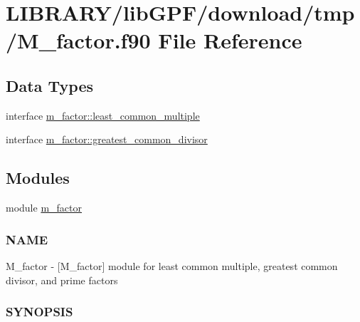 \hypertarget{M__factor_8f90}{}\section{L\+I\+B\+R\+A\+R\+Y/lib\+G\+P\+F/download/tmp/\+M\+\_\+factor.f90 File Reference}
\label{M__factor_8f90}
\subsection*{Data Types}
\begin{DoxyCompactItemize}
\item 
interface \hyperlink{interfacem__factor_1_1least__common__multiple}{m\+\_\+factor\+::least\+\_\+common\+\_\+multiple}
\item 
interface \hyperlink{interfacem__factor_1_1greatest__common__divisor}{m\+\_\+factor\+::greatest\+\_\+common\+\_\+divisor}
\end{DoxyCompactItemize}
\subsection*{Modules}
\begin{DoxyCompactItemize}
\item 
module \hyperlink{namespacem__factor}{m\+\_\+factor}
\begin{DoxyCompactList}\small\item\em \subsubsection*{N\+A\+ME}

M\+\_\+factor -\/ \mbox{[}M\+\_\+factor\mbox{]} module for least common multiple, greatest common divisor, and prime factors \subsubsection*{S\+Y\+N\+O\+P\+S\+IS}\end{DoxyCompactList}\end{DoxyCompactItemize}
